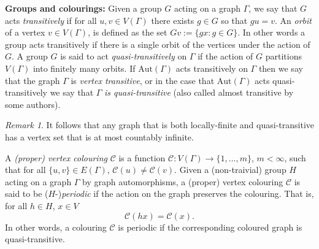 \documentclass{article}
\numberwithin{equation}{section}
\theoremstyle{definition}
\theoremstyle{remark}
\newtheorem{remark}{Remark}[section]
\begin{document}
\textbf{Groups and colourings:} Given a group $G$ acting on a graph $\Gamma$, we say that $G$ acts \textit{transitively} if for all $u,v\in V(\Gamma)$ there exists $g\in G$ so that $gu=v$. An \textit{orbit} of a vertex $v\in V(\Gamma)$, is defined as the set $Gv:=\{gx:g\in G\}$.
In other words a group acts transitively if there is a single orbit of the vertices under the action of $G$. A group $G$ is said to act \textit{quasi-transitively} on $\Gamma$ if the action of $G$ partitions $V(\Gamma)$ into finitely many orbits. If $\text{Aut}(\Gamma)$ acts transitively on $\Gamma$ then we say that the graph $\Gamma$ is \textit{vertex transitive}, or in the case that $\text{Aut}(\Gamma)$ acts quasi-transitively we say that $\Gamma$ \textit{is quasi-transitive} (also called {almost transitive} by some authors).
\begin{remark}
   It follows that any graph that is both locally-finite and quasi-transitive has a vertex set that is at most countably infinite. 
\end{remark}
A \textit{(proper) vertex colouring} $\mathcal{C}$ is a function $\mathcal{C}:V(\Gamma)\rightarrow \{1,\ldots,m\}$, $m<\infty$, such that for all $\{u,v\}\in E(\Gamma)$, $\mathcal{C}(u)\neq\mathcal{C}(v)$. 
Given a (non-traivial) group $H$ acting on a graph $\Gamma$ by graph automorphisms, a (proper) vertex colouring $\mathcal{C}$ is said to be ($H$-)\textit{periodic} if the action on the graph preserves the colouring. That is, for all $h\in H$, $x\in V$
$$\mathcal{C}(hx)=\mathcal{C}(x).$$
In other words, a colouring $\mathcal{C}$ is periodic if the corresponding coloured graph is quasi-transitive.
\end{document}
